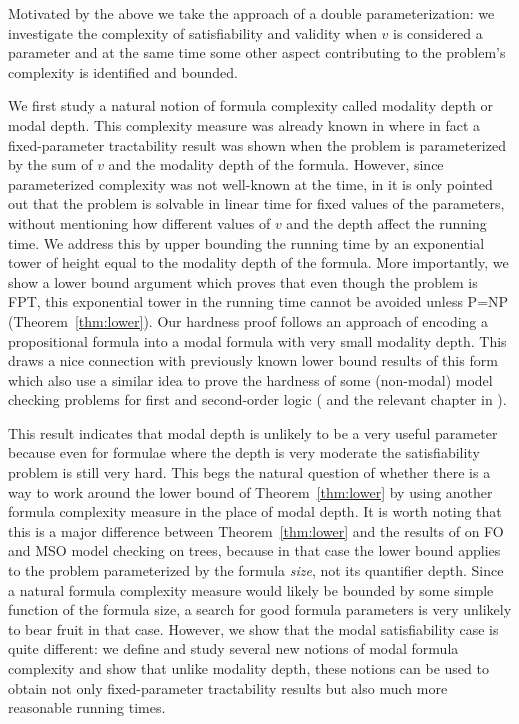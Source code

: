 \documentclass{llncs}
\begin{document}
Motivated by the above we take the approach of a double
parameterization: we investigate the complexity of satisfiability
and validity when $v$ is considered a parameter and at the same time
some other aspect contributing to the problem's complexity is
identified and bounded.

We first study a natural notion of formula complexity called
modality depth or modal depth. This complexity measure was already
known in \cite{DBLP:journals/ai/Halpern95} where in fact a
fixed-parameter tractability result was shown when the problem is
parameterized by the sum of $v$ and the modality depth of the
formula. However, since parameterized complexity was not well-known
at the time, in \cite{DBLP:journals/ai/Halpern95} it is only pointed
out that the problem is solvable in linear time for fixed values of
the parameters, without mentioning how different values of $v$ and
the depth affect the running time.  We address this by upper
bounding the running time by an exponential tower of height equal to
the modality depth of the formula. More importantly, we show a lower
bound argument which proves that even though the problem is FPT, this
exponential tower in the running time cannot be avoided unless P=NP
(Theorem~\ref{thm:lower}).  Our hardness proof follows an approach of encoding
a propositional formula into a modal formula with very small modality depth.
This draws a nice connection with previously known lower bound results of this
form which also use a similar idea to prove the hardness of some (non-modal)
model checking  problems for first and second-order logic
(\cite{DBLP:journals/apal/FrickG04} and the relevant chapter in
\cite{flum2006pct}).


This result indicates that modal depth is unlikely to be a very useful
parameter because even for formulae where the depth is very moderate the
satisfiability problem is still very hard. This begs the natural question of
whether there is a way to work around the lower bound of
Theorem~\ref{thm:lower} by using another formula complexity measure in the
place of modal depth.  It is worth noting that this is a major difference
between Theorem~\ref{thm:lower} and the results of
\cite{DBLP:journals/apal/FrickG04} on FO and MSO model checking on trees,
because in that case the lower bound applies to the problem parameterized by
the formula \emph{size}, not its quantifier depth.  Since a natural formula
complexity measure would likely be bounded by some simple function of the
formula size, a search for good formula parameters is very unlikely to bear
fruit in that case. However, we show that the modal satisfiability case is
quite different: we define and study several new notions of modal formula
complexity and show that unlike modality depth, these notions can be used to
obtain not only fixed-parameter tractability results but also much more
reasonable running times.
\end{document}
